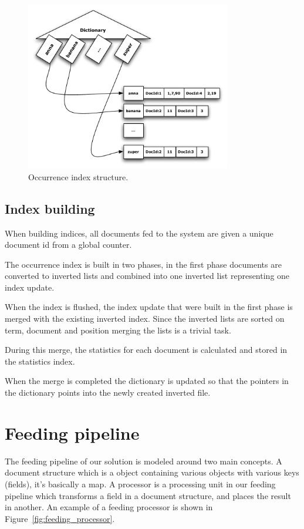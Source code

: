 \begin{figure}[h!!tb]
	\centering
	\includegraphics[width=0.8\textwidth]{index.pdf}
	\caption[Occurrence index structure]{Occurrence index structure.}\label{fig:occ_index_struct}
\end{figure}

\subsection{Index building}\label{sub:index_building}
When building indices, all documents fed to the system are given a unique document id from a global counter.

The occurrence index is built in two phases, in the first phase documents are converted to inverted lists and combined into one inverted list representing one index update. 

When the index is flushed, the index update that were built in the first phase is merged with the existing inverted index. Since the inverted lists are sorted on term, document and position merging the lists is a trivial task. 

During this merge, the statistics for each document is calculated and stored in the statistics index. 

When the merge is completed the dictionary is updated so that the pointers in the dictionary points into the newly created inverted file. 

\section{Feeding pipeline}\label{sec:feeding_pipeline}
The feeding pipeline of our solution is modeled around two main concepts. A document structure which is a object containing various objects with various keys (fields), it's basically a map. A processor is a processing unit in our feeding pipeline which transforms a field in a document structure, and places the result in another. An example of a feeding processor is shown in Figure~\ref{fig:feeding_processor}.

